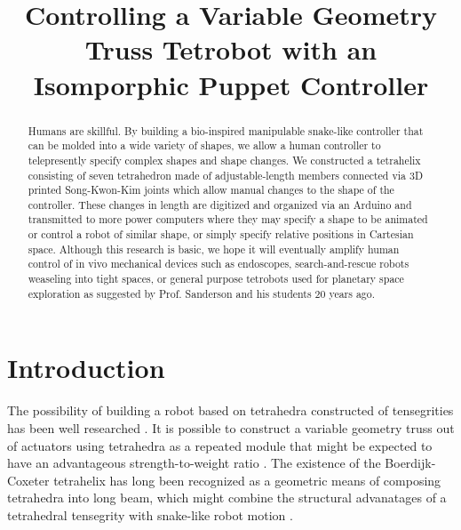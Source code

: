 \documentclass[conference]{article}
\begin{document}
\title{Controlling a Variable Geometry Truss Tetrobot with an Isomporphic Puppet Controller}


\author{}



\maketitle

\begin{abstract}
  Humans are skillful.
  By building a bio-inspired manipulable snake-like controller that can be
  molded into a wide variety of shapes, we allow a human controller to telepresently
  specify complex shapes and shape changes.
  We constructed a tetrahelix consisting of seven tetrahedron made of
  adjustable-length members connected via 3D printed Song-Kwon-Kim joints which
  allow manual changes to the shape of the controller. These changes in length are
  digitized and organized via an Arduino and transmitted to more power computers
  where they may specify a shape to be animated or control a robot of similar shape,
  or simply specify relative positions in Cartesian space. Although this research is basic,
  we hope it will eventually amplify human control of in vivo mechanical devices such as
  endoscopes, search-and-rescue robots weaseling into tight spaces, or general purpose
  tetrobots used for planetary space exploration as suggested by
  Prof. Sanderson and his students 20 years ago.
\end{abstract}



\section{Introduction}

The possibility of building a robot based on tetrahedra constructed of
tensegrities has been well researched \cite{TetrobotBook,NTRT,paul2006,chen2017soft}.
It is possible to construct a variable geometry truss out of actuators
using tetrahedra as a repeated module that might be expected to have
an advantageous strength-to-weight ratio \cite{mikulas1985sequentially,mirletz2014}.
The existence of the Boerdijk-Coxeter tetrahelix \cite{coxeter1985simplicial}
has long been recognized \cite{fuller1982synergetics,graytetrahelix} as a
geometric means of composing tetrahedra into long beam, which
might combine the structural advanatages of a tetrahedral tensegrity with
snake-like robot motion \cite{hirose1993biologically,lilj2012snake}.
\end{document}
